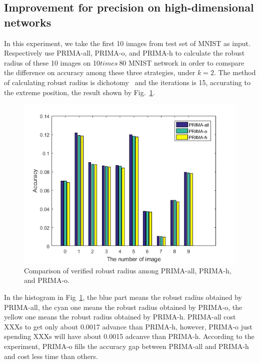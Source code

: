 \documentclass[runningheads]{llncs}
\begin{document}

\subsection{Improvement for precision on high-dimensional networks}

In this experiment, we take the first 10 images from test set of MNIST as input. Respectively use PRIMA-all, PRIMA-o, and PRIMA-h to calculate the robust radius of these 10 images on 10$times\ $80 MNIST network in order to comspare the difference on accuracy among these three strategies, under $k=2$. The method of calculating robust radius is dichotomy~\cite{ref_article5} and the iterations is 15, accurating to the extreme position, the result shown by Fig.~\ref{table2}.

\begin{figure}
\includegraphics[width=\textwidth]{../Fig/FigR3_2.png}
\caption{Comparison of verified robust radius among PRIMA-all, PRIMA-h, and PRIMA-o.} \label{table2}
\end{figure}

In the histogram in Fig~\ref{table2}, the blue part means the robust radius obtained by PRIMA-all, the cyan one means the robust radius obtained by PRIMA-o, the yellow one means the robust radius obtained by PRIMA-h. PRIMA-all cost XXXs to get only about 0.0017 advance than PRIMA-h, however, PRIMA-o just spending XXXs will have about 0.0015 adcanve than PRIMA-h. According to the experiment, PRIMA-o fills the accuracy gap between PRIMA-all and PRIMA-h and cost less time than others.
\end{document}
